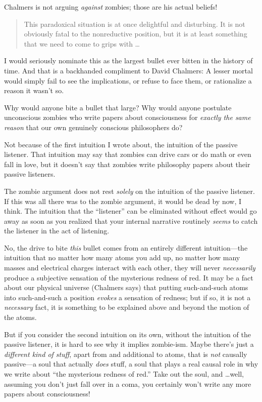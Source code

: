 {
 Chalmers is not arguing \textit{against} zombies; those are his
actual beliefs!}

\begin{quotation}
{
 This paradoxical situation is at once delightful and disturbing.
It is not obviously fatal to the nonreductive position, but it is at
least something that we need to come to grips with \ldots}
\end{quotation}

{
 I would seriously nominate this as the largest bullet ever bitten
in the history of time. And that is a backhanded compliment to David
Chalmers: A lesser mortal would simply fail to see the implications, or
refuse to face them, or rationalize a reason it wasn't
so.}

{
 Why would anyone bite a bullet that large? Why would anyone
postulate unconscious zombies who write papers about consciousness for
\textit{exactly the same reason} that our own genuinely conscious
philosophers do?}

{
 Not because of the first intuition I wrote about, the intuition of
the passive listener. That intuition may say that zombies can drive
cars or do math or even fall in love, but it doesn't
say that zombies write philosophy papers about their passive
listeners.}

{
 The zombie argument does not rest \textit{solely} on the intuition
of the passive listener. If this was all there was to the zombie
argument, it would be dead by now, I think. The intuition that the
``listener'' can be eliminated
without effect would go away as soon as you realized that your internal
narrative routinely \textit{seems} to catch the listener in the act of
listening.}

{
 No, the drive to bite \textit{this} bullet comes from an entirely
different intuition---the intuition that no matter how many atoms you
add up, no matter how many masses and electrical charges interact with
each other, they will never \textit{necessarily} produce a subjective
sensation of the mysterious redness of red. It may be a fact about our
physical universe (Chalmers says) that putting such-and-such atoms into
such-and-such a position \textit{evokes} a sensation of redness; but if
so, it is not a \textit{necessary} fact, it is something to be
explained above and beyond the motion of the atoms.}

{
 But if you consider the second intuition on its own, without the
intuition of the passive listener, it is hard to see why it implies
zombie-ism. Maybe there's just a \textit{different kind
of stuff}, apart from and additional to atoms, that is \textit{not}
causally passive---a soul that actually \textit{does} stuff, a soul
that plays a real causal role in why we write about
``the mysterious redness of red.''
Take out the soul, and \ldots well, assuming you don't
just fall over in a coma, you certainly won't write any
more papers about consciousness!}

